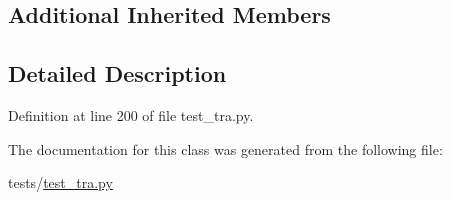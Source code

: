 \subsection*{Additional Inherited Members}


\subsection{Detailed Description}


Definition at line 200 of file test\+\_\+tra.\+py.



The documentation for this class was generated from the following file\+:\begin{DoxyCompactItemize}
\item 
tests/\hyperlink{test__tra_8py}{test\+\_\+tra.\+py}\end{DoxyCompactItemize}
